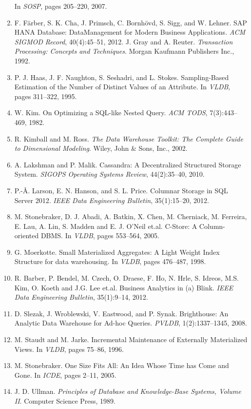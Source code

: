 \documentclass[a4paper,12pt,notitlepage,twoside,openright]{article}
\begin{document}
\begin{enumerate}
  In \emph{SOSP}, pages 205--220, 2007.
\item
  F. F\"{a}rber, S. K. Cha, J. Primsch, C. Bornh\"{o}vd,
  S. Sigg, and W. Lehner. SAP HANA Database: DataManagement for Modern
  Business Applications. \emph{ACM SIGMOD Record}, 40(4):45--51, 2012.
  J. Gray and A. Reuter. \emph{Transaction Processing: Concepts and Techniques}. Morgan Kaufmann Publishers Inc., 1992.
\item
  P. J. Haas, J. F. Naughton, S. Seshadri, and L. Stokes. Sampling-Based
  Estimation of the Number of Distinct Values of an Attribute. In
  \emph{VLDB}, pages 311--322, 1995.
\item
  W. Kim. On Optimizing a SQL-like Nested Query.
  \emph{ACM TODS}, 7(3):443--469, 1982.
\item
  R. Kimball and M. Ross. \emph{The Data Warehouse Toolkit: The Complete Guide to Dimensional Modeling}. Wiley, John
  \& Sons, Inc., 2002.
\item
  A. Lakshman and P. Malik. Cassandra: A
  Decentralized Structured Storage System. \emph{SIGOPS Operating Systems
Review}, 44(2):35--40, 2010.
\item
  P.-\r{A}. Larson, E. N. Hanson, and S. L. Price. Columnar Storage in SQL
  Server 2012. \emph{IEEE Data Engineering Bulletin}, 35(1):15--20,
  2012.
\item
  M. Stonebraker, D. J. Abadi, A. Batkin, X. Chen, M. Cherniack, M.
  Ferreira, E. Lau, A. Lin, S. Madden and E. J. O'Neil et.al. C-Store: A
  Column-oriented DBMS. In \emph{VLDB}, pages 553--564, 2005.
\item
  G. Moerkotte. Small Materialized Aggregates: A Light Weight Index
  Structure for data warehousing. In \emph{VLDB}, pages 476--487, 1998.
\item
  R. Barber, P. Bendel, M. Czech, O. Draese, F. Ho, N. Hrle, S. Idreos,
  M.S. Kim, O. Koeth and J.G. Lee et.al. Business Analytics in (a)
  Blink. \emph{IEEE Data Engineering Bulletin}, 35(1):9--14, 2012.
\item
  D. Slezak, J. Wroblewski, V. Eastwood, and P. Synak. Brighthouse: An
  Analytic Data Warehouse for Ad-hoc Queries. \emph{PVLDB},
  1(2):1337--1345, 2008.
\item
  M. Staudt and M. Jarke. Incremental Maintenance of Externally
  Materialized Views. In \emph{VLDB}, pages 75--86, 1996.
\item
  M. Stonebraker. One Size Fits All: An Idea Whose Time has Come and
  Gone. In \emph{ICDE}, pages 2--11, 2005.
\item
  J. D. Ullman. \emph{Principles of Database and Knowledge-Base Systems,
  Volume II}. Computer Science Press, 1989.
\end{enumerate}
\end{document}
